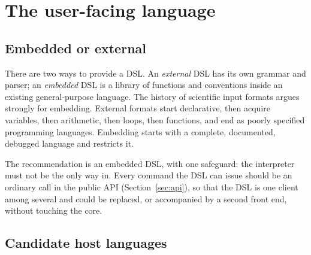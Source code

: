 \documentclass[11pt,a4paper]{article}
\begin{document}
\section{The user-facing language}
\label{sec:dsl}

\subsection{Embedded or external}

There are two ways to provide a DSL.  An \emph{external} DSL has its own
grammar and parser; an \emph{embedded} DSL is a library of functions and
conventions inside an existing general-purpose language.  The history of
scientific input formats argues strongly for embedding.  External formats
start declarative, then acquire variables, then arithmetic, then loops, then
functions, and end as poorly specified programming languages.  Embedding
starts with a complete, documented, debugged language and restricts it.

The recommendation is an embedded DSL, with one safeguard: the interpreter
must not be the only way in.  Every command the DSL can issue should be an
ordinary call in the public API (Section~\ref{sec:api}), so that the DSL is
one client among several and could be replaced, or accompanied by a second
front end, without touching the core.

\subsection{Candidate host languages}
\end{document}

